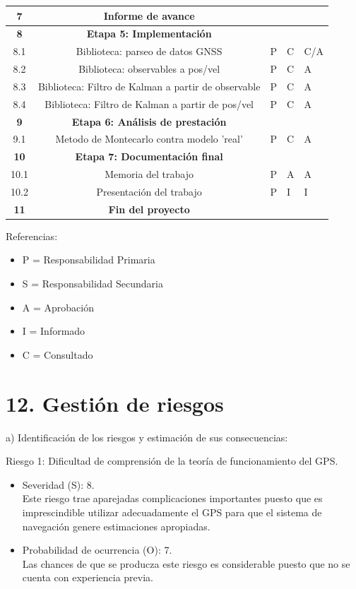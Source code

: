 \documentclass[11pt]{charter}
\begin{document}
\begin{table}[htpb]
{\begin{tabular}{|c|c|m{3cm}|m{3cm}|m{3cm}|}
\rowcolor{lightgray!50}
\textbf{7} 	& \textbf{Informe de avance} 							& 			 	& 				&  \\ \hline
\rowcolor{lightgray!50}
\textbf{8}	& \textbf{Etapa 5: Implementación}						& 			 	& 			 	& \\ \hline
8.1			& Biblioteca: parseo de datos GNSS						& P	 			& C	 			& C/A \\ \hline
8.2			& Biblioteca: observables a pos/vel					& P	 			& C	 			& A	\\ \hline
8.3			& Biblioteca: Filtro de Kalman a partir de observable & P	 			& C	 			& A	\\ \hline
8.4			& Biblioteca: Filtro de Kalman a partir de pos/vel 	& P	 			& C	 			& A	\\ \hline
\rowcolor{lightgray!50}
\textbf{9} 	& \textbf{Etapa 6: Análisis de prestación}				& 				& 			 	&  \\ \hline
9.1			& Metodo de Montecarlo contra modelo 'real' 			& P	 			& C  			& A \\ \hline
\rowcolor{lightgray!50}
\textbf{10}	& \textbf{Etapa 7: Documentación final}				& 			 	& 			 	&  \\ \hline
10.1 		& Memoria del trabajo		 							& P 			& A	 			& A	\\ \hline
10.2 		& Presentación del trabajo		 						& P 			& I	 			& I	\\ \hline
\rowcolor{lightgray!50}
\textbf{11}	& \textbf{Fin del proyecto} 							& 			 	& 				& \\ \hline
\end{tabular}%
}
\end{table}

{\footnotesize
Referencias:
\begin{itemize}
	\item P = Responsabilidad Primaria
	\item S = Responsabilidad Secundaria
	\item A = Aprobación
	\item I = Informado
	\item C = Consultado
\end{itemize}
} %

\section{12. Gestión de riesgos}
\label{sec:riesgos}

a) Identificación de los riesgos y estimación de sus consecuencias:

Riesgo 1: Dificultad de comprensión de la teoría de funcionamiento del GPS.
\begin{itemize}
\item Severidad (S): 8.\\
Este riesgo trae aparejadas complicaciones importantes puesto que es imprescindible utilizar adecuadamente el GPS para que el sistema de navegación genere estimaciones apropiadas.
\item Probabilidad de ocurrencia (O): 7.\\
Las chances de que se producza este riesgo es considerable puesto que no se cuenta con experiencia previa.
\end{itemize}   
\end{document}

